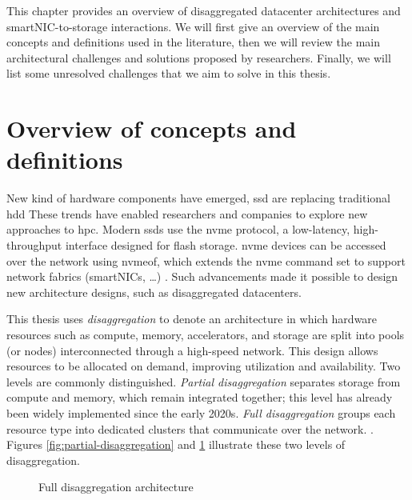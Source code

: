 This chapter provides an overview of disaggregated datacenter architectures and smartNIC-to-storage interactions.  We will first give an overview of
the main concepts and definitions used in the literature, then we will review the main
architectural challenges and solutions proposed by researchers. Finally, we will list some
unresolved challenges that we aim to solve in this thesis.

\section{Overview of concepts and definitions}

New kind of hardware components have emerged, \acrfull{ssd} are replacing traditional \acrfull{hdd}  
These trends have enabled researchers and companies to explore new approaches to \acrfull{hpc}. Modern \acrshort{ssd}s use the \acrfull{nvme} protocol, a low-latency, high-throughput interface designed for flash storage. \acrshort{nvme} devices can be accessed over the network using \acrfull{nvmeof}, which extends the \acrlong{nvme} command set to support network fabrics (smartNICs, \dots) \cite{noauthor_nvme_2021, noauthor_what_nodate, guz_nvme-over-fabrics_2017}. Such advancements made it possible to design new architecture designs, such as disaggregated datacenters. 

This thesis uses \textit{disaggregation} to denote an architecture in which hardware resources such as compute, memory,
accelerators, and storage are split into pools (or nodes) interconnected through a high-speed network. This design allows
resources to be allocated on demand, improving utilization and availability. Two levels are commonly distinguished.
\textit{Partial disaggregation} separates storage from compute and memory, which remain integrated together; this level has
already been widely implemented since the early 2020s. \textit{Full disaggregation} groups each resource type into dedicated
clusters that communicate over the network. \cite{lin_disaggregated_2020}. Figures \ref{fig:partial-disaggregation} and \ref{fig:full-disaggregation} illustrate these two levels of disaggregation.


\begin{figure}[htbp]
	\centering
	\begin{minipage}{0.48\linewidth}
		\centering
		
		\caption{Partial disaggregation architecture}
		\label{fig:partial-disaggregation}
	\end{minipage}
	\begin{minipage}{0.48\linewidth}
		\centering
		
		\caption{Full disaggregation architecture}
		\label{fig:full-disaggregation}
	\end{minipage}
\end{figure}

